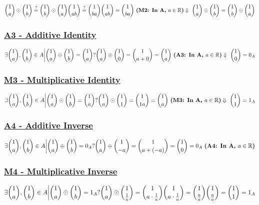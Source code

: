 \documentclass[a4paper, 12pt]{article}
\newcommand{\subsub}[1]{\subsubsection{\underline{#1}}}
\newcommand{\?}{\stackrel{?}{=}}
\newcommand{\R}{\ensuremath{\mathbb{R}}}
\renewcommand{\b}[1]{\textbf{#1}}
\renewcommand{\because}[1]{~\b{(#1)}\\}
\renewcommand{\d}{\ensuremath{\Downarrow\\~}}
\begin{document}
        $
            \dbinom{1}{a} \odot \dbinom{1}{b} \? \dbinom{1}{b} \odot \dbinom{1}{a} \\
            \dbinom{1}{ab} \? \dbinom{1}{ba} \\
            \dbinom{1}{ab} = \dbinom{1}{ba} \because{M2: In A, $a\in\R$}
            \d
            \dbinom{1}{a} \odot \dbinom{1}{b} = \dbinom{1}{b} \odot \dbinom{1}{a}
        $
        \subsub{A3 - Additive Identity}
        $
            \exists\dbinom{1}{a},\dbinom{1}{b}\in{A}\bigg{|}\dbinom{1}{a}\oplus\dbinom{1}{b}=\dbinom{1}{a}? \\
            \dbinom{1}{a}\oplus\dbinom{1}{0}=\dbinom{1}{a+0}=\dbinom{1}{a} \because{A3: In A, $a\in\R$}
            \d
            \dbinom{1}{0} = 0_{A}
        $
        \pagebreak
        \subsub{M3 - Multiplicative Identity}
        $
            \exists\dbinom{1}{a},\dbinom{1}{b}\in{A}\bigg{|}\dbinom{1}{a}\odot\dbinom{1}{b}=\dbinom{1}{a}? \\
            \dbinom{1}{a}\odot\dbinom{1}{1}=\dbinom{1}{1a}=\dbinom{1}{a} \because{M3: In A, $a\in\R$}
            \d
            \dbinom{1}{1} = 1_{A}
        $
        \subsub{A4 - Additive Inverse}
        $
            \exists\dbinom{1}{a},\dbinom{1}{b}\in{A}\bigg{|}\dbinom{1}{a}\oplus\dbinom{1}{b}=0_{A}? \\
            \dbinom{1}{a}\oplus\dbinom{1}{-a}=\dbinom{1}{a+(-a)}=\dbinom{1}{0}=0_{A} \because{A4: In A, $a\in\R$}
        $
        \subsub{M4 - Multiplicative Inverse}
        $
            \exists\dbinom{1}{a},\dbinom{1}{b}\in{A}\bigg{|}\dbinom{1}{a}\odot\dbinom{1}{b}=1_{A}? \\
            \dbinom{1}{a}\odot\dbinom{1}{\frac{1}{a}}=\dbinom{1}{a\cdot{\frac{1}{a}}} \\
            \dbinom{1}{a\cdot{\frac{1}{a}}} = \dbinom{1}{\frac{a}{a}} \\
            \dbinom{1}{\frac{a}{a}} = \dbinom{1}{1} = 1_{A} \\
        $

\end{document}
